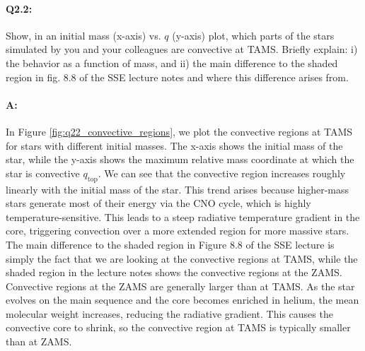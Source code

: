 \documentclass[twocolumn,fontsize=11pt]{scrartcl}
\begin{document}
\paragraph{Q2.2:} Show, in an initial mass (x-axis) vs. \(q\) (y-axis) plot, which parts of the stars simulated by you and your colleagues are convective at TAMS. Briefly explain: i) the behavior as a function of mass, and ii) the main difference to the shaded region in fig. 8.8 of the SSE lecture notes and where this difference arises from.

\paragraph{A:} In Figure \ref{fig:q22_convective_regions}, we plot the convective regions at TAMS for stars with different initial masses. The x-axis shows the initial mass of the star, while the y-axis shows the maximum relative mass coordinate at which the star is convective \(q_\text{top}\). We can see that the convective region increases roughly linearly with the initial mass of the star. This trend arises because higher-mass stars generate most of their energy via the CNO cycle, which is highly temperature-sensitive. This leads to a steep radiative temperature gradient in the core, triggering convection over a more extended region for more massive stars. The main difference to the shaded region in Figure 8.8 of the SSE lecture is simply the fact that we are looking at the convective regions at TAMS, while the shaded region in the lecture notes shows the convective regions at the ZAMS. Convective regions at the ZAMS are generally larger than at TAMS. As the star evolves on the main sequence and the core becomes enriched in helium, the mean molecular weight increases, reducing the radiative gradient. This causes the convective core to shrink, so the convective region at TAMS is typically smaller than at ZAMS.
\end{document}
